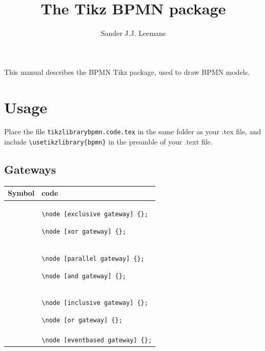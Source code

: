 \documentclass{article}
\title{The Tikz BPMN package}
\author{Sander J.J. Leemans}
\begin{document}
	\maketitle
	
	This manual describes the BPMN Tikz package, used to draw BPMN models.
	
	\def\event#1{
		\eventsymbol{#1}
		&
		\eventcode{#1}
	}
	
	\def\eventsymbol#1{
		\begin{tikzpicture}[baseline]
			\node [#1] {};
		\end{tikzpicture}
	}
	\def\eventcode#1{
		\texttt{\textbackslash{}node [#1] \{\};}
	}
	
	\def\boundary#1{
		\begin{tikzpicture}[baseline]
			\node [task, label={[#1]225:}] {};
		\end{tikzpicture}
		&
		\texttt{\textbackslash{}node [task, label=\{[#1]225:\}] \{\};}
	}
	
	\section{Usage}
		Place the file \texttt{tikzlibrarybpmn.code.tex} in the same folder as your .tex file, and include \verb!\usetikzlibrary{bpmn}! in the preamble of your .text file.
		
		\subsection{Gateways}
			\begin{tabularx}{\linewidth}{cX}
				\toprule
				Symbol & code\\
				\midrule
				\event{exclusive gateway}\newline\eventcode{xor gateway}\\
				\event{parallel gateway}\newline\eventcode{and gateway}\\
				\event{inclusive gateway}\newline\eventcode{or gateway}\\
				\event{eventbased gateway}\\
				\bottomrule
			\end{tabularx}
		
\end{document}
